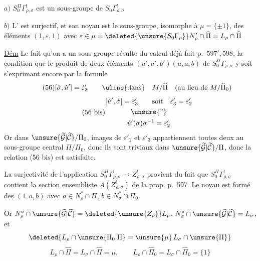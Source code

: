 $a)$ $S_0^\Pi\Gamma_{\rho,\sigma}^{!}$ est un sous-groupe de
$S_0\Gamma_{\rho,\sigma}^{!}$

$b)$ L' 
est surjectif, et son noyau est le sous-groupe, isomorphe à
$\mu=\{\pm1\}$, des éléments $(1,\varepsilon,1)$ avec
$\varepsilon\in\mu=\deleted{\unsure{S_0\Gamma_{\rho}}}
N'_\rho\cap\widehat\Pi=L_\rho\cap\widehat\Pi$


\uline{Dém} Le fait qu'on a un sous-groupe résulte du calcul déjà fait p.\ $597',598$, la condition que le produit de deux éléments $(u',a',b')(u,a,b)$ de $S_0^{\Pi}\Gamma_{\rho,\sigma}$ y soit s'exprimant encore par la formule
\[
\tag{56}
[\dot\sigma,\dot u']=\dot\varepsilon'_3
\qquad\text{\uline{dans}}\quad M/\widehat\Pi
\quad(\text{au lieu de }M/\widehat\Pi_0)
\]
\[
\tag{56 bis}
\begin{gathered}
[\dot u',\dot\sigma]=\dot\varepsilon'_3
\qquad\text{soit}\quad \dot\varepsilon'_3=\dot\varepsilon'_2\\
\unsure{\text{''}}\\
\dot u'(\dot\sigma)\dot\sigma^{-1}=\dot\varepsilon'_2
\end{gathered}
\]
Or dans $\unsure{\widetilde{\mathcal G}|\widetilde{\mathcal C}}/\Pi_0$,  images de $\varepsilon'_2$ et $\varepsilon'_3$ appartiennent toutes deux au sous-groupe central $\Pi/\Pi_0$, donc ils sont triviaux dans $\unsure{\widetilde{\mathcal G}|\widetilde{\mathcal C}}/\Pi$, donc la relation (56 bis) est  satisfaite.

La surjectivité de l'application $S_0^\Pi\Gamma^!_{\rho,\sigma}\longrightarrow Z^!_{\rho,\sigma}$ provient du fait que $S_0^\Pi\Gamma^!_{\rho,\sigma}$ contient la section ensembliste $A(Z^!_{\rho,\sigma})$ de la prop. p.\ 597. Le noyau est formé des  $(1,a,b)$ avec $a\in N_\rho^*\cap\Pi$, $b\in N_\sigma^*\cap\Pi_0$.

Or $N_\rho^*\cap\unsure{\widetilde{\mathcal G}|\widetilde{\mathcal C}}=\deleted{\unsure{Z_\rho}}L_\rho$, $N_\sigma^*\cap\unsure{\widetilde{\mathcal G}|\widetilde{\mathcal C}}=L_\sigma$, et
\[
\deleted{L_\rho\cap\unsure{\Pi_0|\Pi}=\unsure{\mu}\,L_\sigma\cap\unsure{\Pi}}
\]
\[
\tag{57}
L_\rho\cap\widehat\Pi=L_\sigma\cap\widehat\Pi=\mu,
\qquad L_\rho\cap\widehat\Pi_0=L_\sigma\cap\widehat\Pi_0=\{1\}
\]

